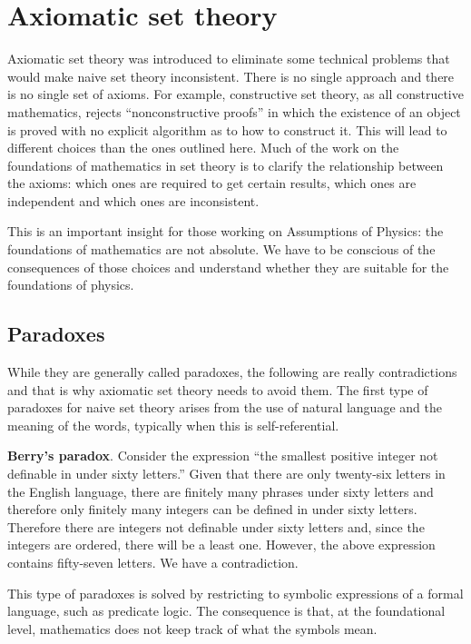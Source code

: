 \documentclass{bareminimum}
\begin{document}
\section{Axiomatic set theory}

Axiomatic set theory was introduced to eliminate some technical problems that would make naive set theory inconsistent. There is no single approach and there is no single set of axioms. For example, constructive set theory, as all constructive mathematics, rejects ``nonconstructive proofs'' in which the existence of an object is proved with no explicit algorithm as to how to construct it. This will lead to different choices than the ones outlined here. Much of the work on the foundations of mathematics in set theory is to clarify the relationship between the axioms: which ones are required to get certain results, which ones are independent and which ones are inconsistent.

This is an important insight for those working on Assumptions of Physics: the foundations of mathematics are not absolute. We have to be conscious of the consequences of those choices and understand whether they are suitable for the foundations of physics.

\subsection{Paradoxes}

While they are generally called paradoxes, the following are really contradictions and that is why axiomatic set theory needs to avoid them. The first type of paradoxes for naive set theory arises from the use of natural language and the meaning of the words, typically when this is self-referential.

\textbf{Berry's paradox}. Consider the expression ``the smallest positive integer not definable in under sixty letters.'' Given that there are only twenty-six letters in the English language, there are finitely many phrases under sixty letters and therefore only finitely many integers can be defined in under sixty letters. Therefore there are integers not definable under sixty letters and, since the integers are ordered, there will be a least one. However, the above expression contains fifty-seven letters. We have a contradiction.

This type of paradoxes is solved by restricting to symbolic expressions of a formal language, such as predicate logic. The consequence is that, at the foundational level, mathematics does not keep track of what the symbols mean.
\end{document}
